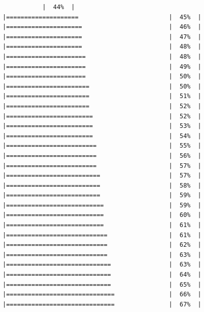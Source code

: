 \documentclass[
  krantz2]{krantz}
\begin{document}
\begin{verbatim}
           |  44%  |                                                     |====================                         |  45%  |                                                     |=====================                        |  46%  |                                                     |=====================                        |  47%  |                                                     |=====================                        |  48%  |                                                     |======================                       |  48%  |                                                     |======================                       |  49%  |                                                     |======================                       |  50%  |                                                     |=======================                      |  50%  |                                                     |=======================                      |  51%  |                                                     |=======================                      |  52%  |                                                     |========================                     |  52%  |                                                     |========================                     |  53%  |                                                     |========================                     |  54%  |                                                     |=========================                    |  55%  |                                                     |=========================                    |  56%  |                                                     |=========================                    |  57%  |                                                     |==========================                   |  57%  |                                                     |==========================                   |  58%  |                                                     |==========================                   |  59%  |                                                     |===========================                  |  59%  |                                                     |===========================                  |  60%  |                                                     |===========================                  |  61%  |                                                     |============================                 |  61%  |                                                     |============================                 |  62%  |                                                     |============================                 |  63%  |                                                     |=============================                |  63%  |                                                     |=============================                |  64%  |                                                     |=============================                |  65%  |                                                     |==============================               |  66%  |                                                     |==============================               |  67%  |                                                     
\end{verbatim}
\end{document}
